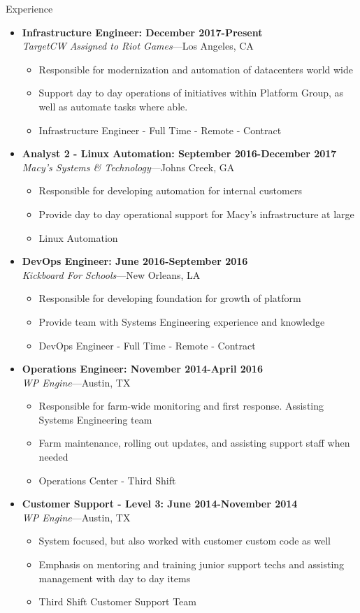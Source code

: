 \documentclass[10pt,oneside]{article}
\newenvironment{ressection}[1]{
    \vspace{4pt}
    {\fontfamily{phv}\selectfont\Large#1}
    \begin{itemize}
    \vspace{3pt}
}{
    \end{itemize}
}
\newcommand{\resitem}[1]{
    \vspace{-4pt}
    \item \begin{flushleft} #1 \end{flushleft}
}
\newcommand{\ressubitem}[1]{
    \vspace{-1pt}
    \item \begin{flushleft} #1 \end{flushleft}
}
\newcommand{\resbigitem}[3]{
    \vspace{-5pt}
    \item
    \textbf{#3} \\
    \textit{#1}---#2
}
\newenvironment{ressubsec}[3]{
    \resbigitem{#1}{#2}{#3}
    \vspace{-2pt}
    \begin{itemize}
}{
    \end{itemize}
}
\newenvironment{reslist}[1]{
    \resitem{\textbf{#1}}
    \vspace{-5pt}
    \begin{itemize}
}{
    \end{itemize}
}
\begin{document}
\begin{ressection}{Experience}

    \begin{ressubsec}{TargetCW Assigned to Riot Games}{Los Angeles, CA}{Infrastructure Engineer: December 2017-Present}
        \ressubitem{Responsible for modernization and automation of datacenters world wide}
        \ressubitem{Support day to day operations of initiatives within Platform Group, as well as automate tasks where able.}
        \ressubitem{Infrastructure Engineer - Full Time - Remote - Contract}
    \end{ressubsec}

    \begin{ressubsec}{Macy's Systems \& Technology}{Johns Creek, GA}{Analyst 2 - Linux Automation: September 2016-December 2017}
        \ressubitem{Responsible for developing automation for internal customers}
        \ressubitem{Provide day to day operational support for Macy's infrastructure at large}
        \ressubitem{Linux Automation}
    \end{ressubsec}

    \begin{ressubsec}{Kickboard For Schools}{New Orleans, LA}{DevOps Engineer: June 2016-September 2016}
        \ressubitem{Responsible for developing foundation for growth of platform}
        \ressubitem{Provide team with Systems Engineering experience and knowledge}
        \ressubitem{DevOps Engineer - Full Time - Remote - Contract}
    \end{ressubsec}

    \begin{ressubsec}{WP Engine}{Austin, TX}{Operations Engineer: November 2014-April 2016}
        \ressubitem{Responsible for farm-wide monitoring and first response.  Assisting Systems Engineering team}
        \ressubitem{Farm maintenance, rolling out updates, and assisting support staff when needed}
        \ressubitem{Operations Center - Third Shift}
    \end{ressubsec}

    \begin{ressubsec}{WP Engine}{Austin, TX}{Customer Support - Level 3: June 2014-November 2014}
        \ressubitem{System focused, but also worked with customer custom code as well}
        \ressubitem{Emphasis on mentoring and training junior support techs and assisting management with day to day items}
        \ressubitem{Third Shift Customer Support Team}
    \end{ressubsec}


\end{ressection}
\end{document}
